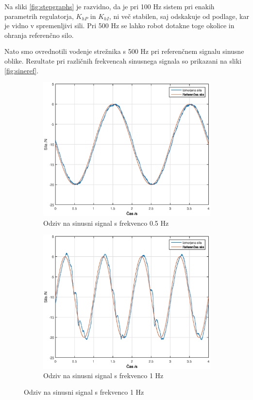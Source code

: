 \documentclass[a4paper]{article}
\begin{document}
Na sliki \ref{fig:stepgraphs} je razvidno, da je pri 100 Hz sistem pri enakih parametrih regulatorja, $K_{hP}$ in $K_{hI}$, ni več stabilen, saj odskakuje od podlage, kar je vidno v spremenljivi sili. Pri 500 Hz se lahko robot dotakne toge okolice in ohranja referenčno silo.

Nato smo ovrednotili vodenje strežnika s 500 Hz pri referenčnem signalu sinusne oblike. Rezultate pri različnih frekvencah sinusnega signala so prikazani na sliki \ref{fig:sineref}.

\begin{figure}[!ht]
	
\centering

	\begin{subfigure}[b]{0.4\textwidth}
		\includegraphics[width=\textwidth]{./slike/figure_5_hz.eps}
		\caption{Odziv na sinusni signal s frekvenco 0.5 Hz}
	\end{subfigure}

	\begin{subfigure}[b]{0.4\textwidth}
		\includegraphics[width=\textwidth]{./slike/figure_10_hz.eps}
		\caption{Odziv na sinusni signal s frekvenco 1 Hz}
	\end{subfigure}
	

\end{figure}
\end{document}

